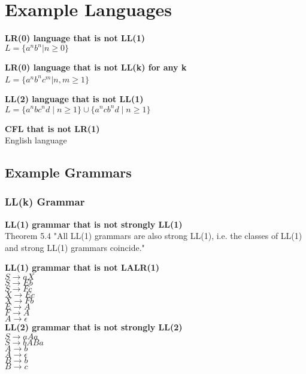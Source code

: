 
\section{Example Languages}
\textbf{LR(0) language that is not LL(1)}\\
    $L = \{a^n b^n | n \geq 0\}$

\textbf{LR(0) language that is not LL(k) for any k}\\
$L = \{a^n b^n c^m | n, m \geq 1\} $\

\textbf{LL(2) language that is not LL(1)}\\
$L = \{ a^n b c^n d \mid n \geq 1 \} \cup \{ a^n c b^n d \mid n \geq 1 \}$

\textbf{CFL that is not LR(1)}\\
    English language

\subsection{Example Grammars}
\subsubsection{LL(k) Grammar}
\textbf{LL(1) grammar that is not strongly LL(1)}\\ %
    Theorem 5.4 "All LL(1) grammars are also strong LL(1), i.e. the classes of LL(1) and strong LL(1) grammars coincide."
    
\textbf{LL(1) grammar that is not LALR(1)}\\ %
    $S\rightarrow aX$\\
    $S\rightarrow Eb$\\
    $S\rightarrow F c$\\
    $X\rightarrow Ec$\\
    $X\rightarrow F b$\\
    $E\rightarrow A$\\
    $F\rightarrow A$\\
    $A\rightarrow \epsilon$\\

\textbf{LL(2) grammar that is not strongly LL(2)}\\ %
    $S \rightarrow aAa$\\
    $S \rightarrow bABa$\\
    $A \rightarrow b$\\
    $A \rightarrow \epsilon$\\
    $B \rightarrow b$\\
    $B \rightarrow c$\\
    
